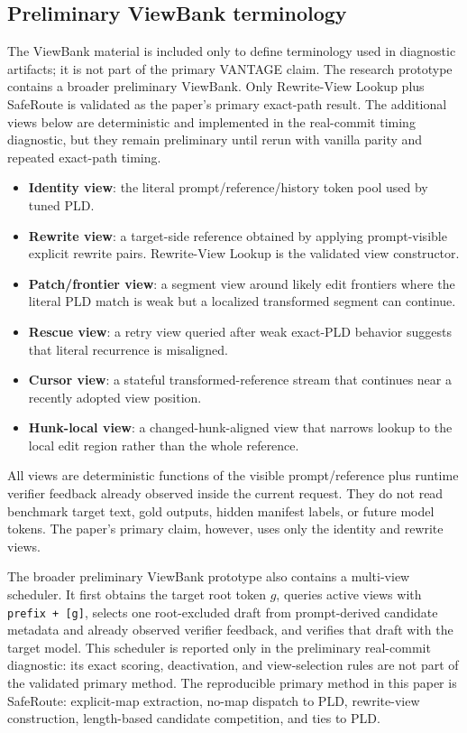 \documentclass[11pt,a4paper]{article}
\begin{document}
\subsection{Preliminary ViewBank terminology}
\label{app:viewbank-terminology}

The ViewBank material is included only to define terminology used in diagnostic
artifacts; it is not part of the primary VANTAGE claim. The research prototype
contains a broader preliminary ViewBank. Only Rewrite-View Lookup plus
SafeRoute is validated as the paper's primary exact-path result. The additional
views below are deterministic and implemented in the real-commit timing
diagnostic, but they remain preliminary until rerun with vanilla parity and
repeated exact-path timing.

\begin{itemize}
\item \textbf{Identity view}: the literal prompt/reference/history token pool
  used by tuned PLD.
\item \textbf{Rewrite view}: a target-side reference obtained by applying
  prompt-visible explicit rewrite pairs. Rewrite-View Lookup is the validated
  view constructor.
\item \textbf{Patch/frontier view}: a segment view around likely edit frontiers
  where the literal PLD match is weak but a localized transformed segment can
  continue.
\item \textbf{Rescue view}: a retry view queried after weak exact-PLD behavior
  suggests that literal recurrence is misaligned.
\item \textbf{Cursor view}: a stateful transformed-reference stream that
  continues near a recently adopted view position.
\item \textbf{Hunk-local view}: a changed-hunk-aligned view that narrows lookup
  to the local edit region rather than the whole reference.
\end{itemize}

All views are deterministic functions of the visible prompt/reference plus
runtime verifier feedback already observed inside the current request. They do
not read benchmark target text, gold outputs, hidden manifest labels, or future
model tokens. The paper's primary claim, however, uses only the identity and
rewrite views.

The broader preliminary ViewBank prototype also contains a multi-view
scheduler. It first obtains the target root token $g$, queries active views with
\texttt{prefix + [g]}, selects one root-excluded draft from prompt-derived
candidate metadata and already observed verifier feedback, and verifies that
draft with the target model. This scheduler is reported only in the preliminary
real-commit diagnostic: its exact scoring, deactivation, and view-selection
rules are not part of the validated primary method. The reproducible primary
method in this paper is SafeRoute: explicit-map extraction, no-map dispatch to
PLD, rewrite-view construction, length-based candidate competition, and ties to
PLD.
\end{document}
